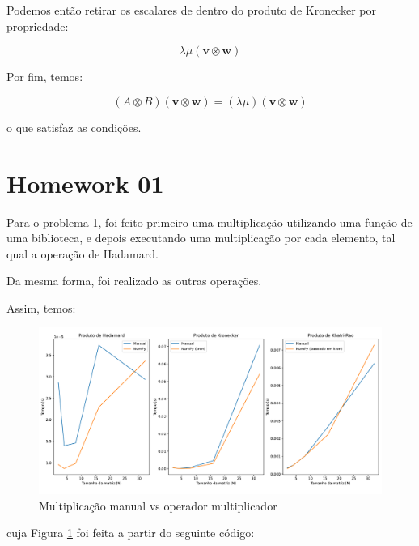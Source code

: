 \documentclass[a4paper, 12pt]{article}
\let\oldsection\section
\renewcommand{\section}[1]{{\vspace{20pt}\oldsection*{#1}\vspace{-10pt}}}
\begin{document}
	Podemos então retirar os escalares de dentro do produto de Kronecker por propriedade:
	
	\begin{equation}
		\lambda\mu (\mathbf{v} \otimes \mathbf{w})
	\end{equation}
	
	Por fim, temos: 
	
	\begin{equation}
		(A \otimes B)(\mathbf{v} \otimes \mathbf{w}) = (\lambda\mu)(\mathbf{v} \otimes \mathbf{w})
	\end{equation}
	
	o que satisfaz as condições. 
	
	\section{Homework 01}
	
	Para o problema 1, foi feito primeiro uma multiplicação utilizando uma função de uma biblioteca, e depois executando uma multiplicação por cada elemento, tal qual a operação de Hadamard.
	
	Da mesma forma, foi realizado as outras operações. 
	
	Assim, temos: 
	
	\begin{figure}[h!]
		\centering
		\includegraphics[width=0.9\linewidth]{images/comparativo_operacoes.pdf}
		\caption{Multiplicação manual vs operador multiplicador}
		\label{fig:comparativo}
	\end{figure}
	
	cuja Figura \ref{fig:comparativo} foi feita a partir do seguinte código:
	
\end{document}
